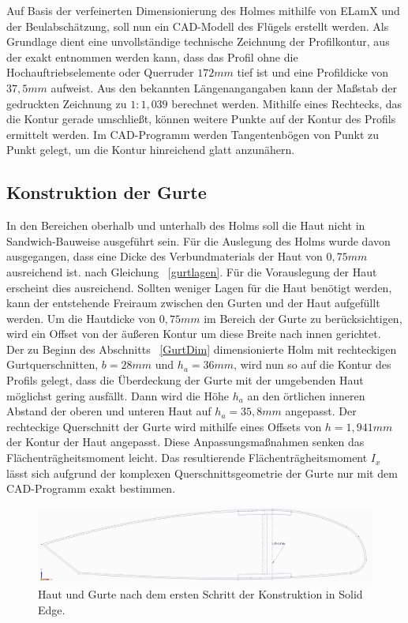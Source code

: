 Auf Basis der verfeinerten Dimensionierung des Holmes mithilfe von ELamX und der Beulabschätzung, soll nun ein CAD-Modell des Flügels erstellt werden. Als Grundlage dient eine unvollständige technische Zeichnung der Profilkontur, aus der exakt entnommen werden kann, dass das Profil ohne die Hochauftriebselemente oder Querruder $ 172mm $ tief ist und eine Profildicke von $ 37,5mm $ aufweist. Aus den bekannten Längenangangaben kann der Maßstab der gedruckten Zeichnung zu $ 1:1,039 $ berechnet werden. Mithilfe eines Rechtecks, das die Kontur gerade umschließt, können weitere Punkte auf der Kontur des Profils ermittelt werden. Im CAD-Programm werden Tangentenbögen von Punkt zu Punkt gelegt, um die Kontur hinreichend glatt anzunähern.\\

\subsection{Konstruktion der Gurte}
\noindent In den Bereichen oberhalb und unterhalb des Holms soll die Haut nicht in Sandwich-Bauweise ausgeführt sein. Für die Auslegung des Holms wurde davon ausgegangen, dass eine Dicke des Verbundmaterials der Haut von $ 0,75mm $ ausreichend ist.  nach Gleichung ~\ref{gurtlagen}. Für die Vorauslegung der Haut erscheint dies ausreichend. Sollten weniger Lagen für die Haut benötigt werden, kann der entstehende Freiraum zwischen den Gurten und der Haut aufgefüllt werden. Um die Hautdicke von $ 0,75mm $ im Bereich der Gurte zu berücksichtigen, wird ein Offset von der äußeren Kontur um diese Breite nach innen gerichtet.\\
\noindent Der zu Beginn des Abschnitts ~\ref{GurtDim} dimensionierte Holm mit rechteckigen Gurtquerschnitten, $ b=28mm $ und $ h_{a}=36mm $, wird nun so auf die Kontur des Profils gelegt, dass die Überdeckung der Gurte mit der umgebenden Haut möglichst gering ausfällt. Dann wird die Höhe $ h_{a} $ an den örtlichen inneren Abstand der oberen und unteren Haut auf $ {h_{a}}=35,8mm $ angepasst. Der rechteckige Querschnitt der Gurte wird mithilfe eines Offsets von $ {h}=1,941mm $ der Kontur der Haut angepasst. Diese Anpassungsmaßnahmen senken das Flächenträgheitsmoment leicht. Das resultierende Flächenträgheitsmoment $ {I_{x}} $ lässt sich aufgrund der komplexen Querschnittsgeometrie der Gurte nur mit dem CAD-Programm exakt bestimmen. 
\begin{figure}[h]
	\includegraphics[width=1.0\textwidth]{Bilder/Kontur.jpg}
	\caption{Haut und Gurte nach dem ersten Schritt der Konstruktion in Solid Edge.}
	\label{fig: Kontur}
\end{figure} 
